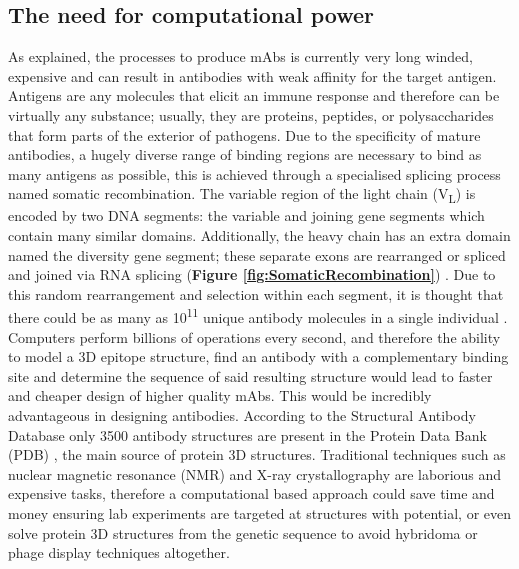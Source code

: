 \subsection{The need for computational power}

As explained, the processes to produce mAbs is currently very long winded, expensive and can result in antibodies with weak affinity for the target antigen. Antigens are any molecules that elicit an immune response and therefore can be virtually any substance; usually, they are proteins, peptides, or polysaccharides that form parts of the exterior of pathogens. Due to the specificity of mature antibodies, a hugely diverse range of binding regions are necessary to bind as many antigens as possible, this is achieved through a specialised splicing process named somatic recombination. The variable region of the light chain (V\textsubscript{L}) is encoded by two DNA segments: the variable and joining gene segments which contain many similar domains. Additionally, the heavy chain has an extra domain named the diversity gene segment; these separate exons are rearranged or spliced and joined via RNA splicing (\textbf{Figure \ref{fig:SomaticRecombination}}) \cite{rothRecombinationMechanismErrors2014}. Due to this random rearrangement and selection within each segment, it is thought that there could be as many as 10\textsuperscript{11} unique antibody molecules in a single individual \cite{glanvillePreciseDeterminationDiversity2009}. 
\\[12pt]
Computers perform billions of operations every second, and therefore the ability to model a 3D epitope structure, find an antibody with a complementary binding site and determine the sequence of said resulting structure would lead to faster and cheaper design of higher quality mAbs. This would be incredibly advantageous in designing antibodies. According to the Structural Antibody Database \cite{dunbarSAbDabStructuralAntibody2014} only 3500 antibody structures are present in the Protein Data Bank (PDB) \cite{bermanProteinDataBank2000a}, the main source of protein 3D structures. Traditional techniques such as nuclear magnetic resonance (NMR) and X-ray crystallography are laborious and expensive tasks, therefore a computational based approach could save time and money ensuring lab experiments are targeted at structures with potential, or even solve protein 3D structures from the genetic sequence to avoid hybridoma or phage display techniques altogether.

